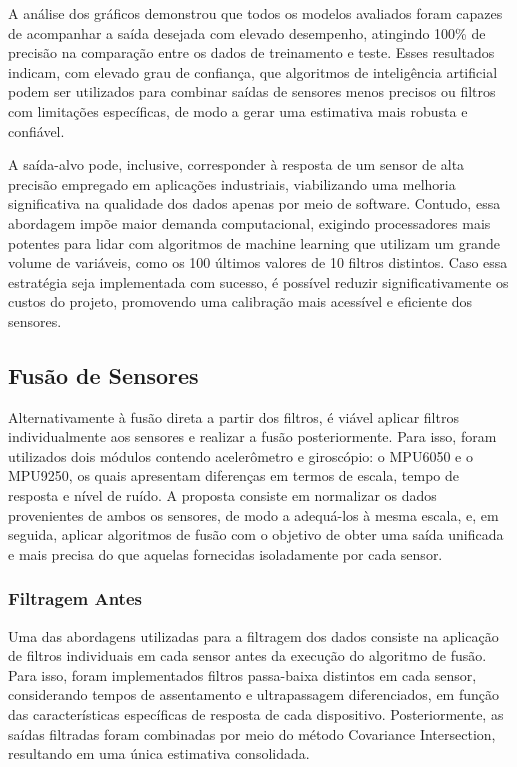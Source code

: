 \documentclass[a4paper, 12pt]{article}
\begin{document}
            A análise dos gráficos demonstrou que todos os modelos avaliados foram capazes de acompanhar a saída desejada com elevado desempenho, atingindo 100\% de precisão na comparação entre os dados de treinamento e teste. Esses resultados indicam, com elevado grau de confiança, que algoritmos de inteligência artificial podem ser utilizados para combinar saídas de sensores menos precisos ou filtros com limitações específicas, de modo a gerar uma estimativa mais robusta e confiável. 
            
            A saída-alvo pode, inclusive, corresponder à resposta de um sensor de alta precisão empregado em aplicações industriais, viabilizando uma melhoria significativa na qualidade dos dados apenas por meio de software. Contudo, essa abordagem impõe maior demanda computacional, exigindo processadores mais potentes para lidar com algoritmos de machine learning que utilizam um grande volume de variáveis, como os 100 últimos valores de 10 filtros distintos. Caso essa estratégia seja implementada com sucesso, é possível reduzir significativamente os custos do projeto, promovendo uma calibração mais acessível e eficiente dos sensores.

    \newpage
    \subsection{Fusão de Sensores}
        Alternativamente à fusão direta a partir dos filtros, é viável aplicar filtros individualmente aos sensores e realizar a fusão posteriormente. Para isso, foram utilizados dois módulos contendo acelerômetro e giroscópio: o MPU6050 e o MPU9250, os quais apresentam diferenças em termos de escala, tempo de resposta e nível de ruído. A proposta consiste em normalizar os dados provenientes de ambos os sensores, de modo a adequá-los à mesma escala, e, em seguida, aplicar algoritmos de fusão com o objetivo de obter uma saída unificada e mais precisa do que aquelas fornecidas isoladamente por cada sensor.

        \subsubsection{Filtragem Antes}
            Uma das abordagens utilizadas para a filtragem dos dados consiste na aplicação de filtros individuais em cada sensor antes da execução do algoritmo de fusão. Para isso, foram implementados filtros passa-baixa distintos em cada sensor, considerando tempos de assentamento e ultrapassagem diferenciados, em função das características específicas de resposta de cada dispositivo. Posteriormente, as saídas filtradas foram combinadas por meio do método Covariance Intersection, resultando em uma única estimativa consolidada.
            
\end{document}
